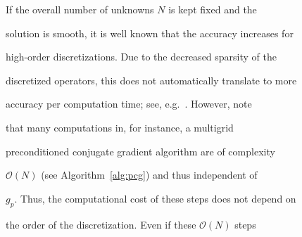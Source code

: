 \documentclass[smallcondensed,final]{svjour3}     %
\begin{document}




%




%












If the overall number of unknowns $N$ is kept fixed and the

solution is smooth, it is well known that the accuracy increases for

high-order discretizations. Due to the decreased sparsity of the

discretized operators, this does not automatically translate to more

accuracy per computation time; see, e.g.~\cite{Brown10}. However, note

that many computations in, for instance, a multigrid

preconditioned conjugate gradient algorithm are of complexity

$\mathcal{O}(N)$ (see Algorithm~\ref{alg:pcg}) and thus independent of

$g_p$. Thus, the computational cost of these steps does not depend on

the order of the discretization. Even if these $\mathcal{O}(N)$ steps
\end{document}
